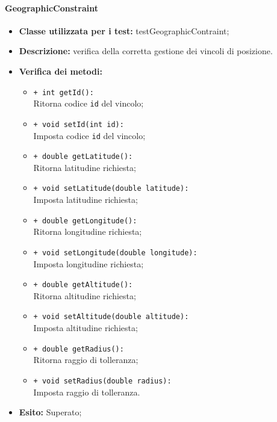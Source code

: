 \paragraph{GeographicConstraint}
\begin{flushleft}
\begin{itemize}
\item \textbf{Classe utilizzata per i test:} testGeographicContraint;
\item \textbf{Descrizione:} verifica della corretta gestione dei vincoli di posizione.
\item \textbf{Verifica dei metodi:}
\begin{sloppypar}
\begin{itemize}
\item \texttt{+ int getId():}\\ Ritorna codice \texttt{id} del vincolo;
\item \texttt{+ void setId(int id):}\\ Imposta codice \texttt{id} del vincolo;
\item \texttt{+ double getLatitude():}\\ Ritorna latitudine richiesta;
\item \texttt{+ void setLatitude(double latitude):}\\ Imposta latitudine richiesta;
\item \texttt{+ double getLongitude():}\\ Ritorna longitudine richiesta;
\item \texttt{+ void setLongitude(double longitude):}\\ Imposta longitudine richiesta;
\item \texttt{+ double getAltitude():}\\ Ritorna altitudine richiesta;
\item \texttt{+ void setAltitude(double altitude):}\\ Imposta altitudine richiesta;
\item \texttt{+ double getRadius():}\\ Ritorna raggio di tolleranza;
\item \texttt{+ void setRadius(double radius):}\\ Imposta raggio di tolleranza.
\end{itemize}
\end{sloppypar}
\item \textbf{Esito:} Superato;
\end{itemize}
\end{flushleft}

